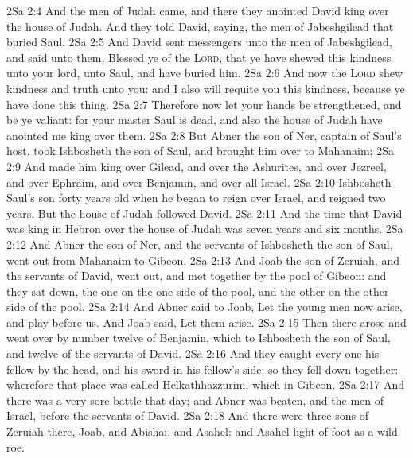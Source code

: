 \vs 2Sa 2:4 And the men of Judah came, and there they anointed David king over the house of Judah. And they told David, saying,  the men of Jabeshgilead  that buried Saul.
\vs 2Sa 2:5 And David sent messengers unto the men of Jabeshgilead, and said unto them, Blessed  ye of the \textsc{Lord}, that ye have shewed this kindness unto your lord,  unto Saul, and have buried him.
\vs 2Sa 2:6 And now the \textsc{Lord} shew kindness and truth unto you: and I also will requite you this kindness, because ye have done this thing.
\vs 2Sa 2:7 Therefore now let your hands be strengthened, and be ye valiant: for your master Saul is dead, and also the house of Judah have anointed me king over them.
\vs 2Sa 2:8 But Abner the son of Ner, captain of Saul's host, took Ishbosheth the son of Saul, and brought him over to Mahanaim;
\vs 2Sa 2:9 And made him king over Gilead, and over the Ashurites, and over Jezreel, and over Ephraim, and over Benjamin, and over all Israel.
\vs 2Sa 2:10 Ishbosheth Saul's son  forty years old when he began to reign over Israel, and reigned two years. But the house of Judah followed David.
\vs 2Sa 2:11 And the time that David was king in Hebron over the house of Judah was seven years and six months.
\vs 2Sa 2:12 And Abner the son of Ner, and the servants of Ishbosheth the son of Saul, went out from Mahanaim to Gibeon.
\vs 2Sa 2:13 And Joab the son of Zeruiah, and the servants of David, went out, and met together by the pool of Gibeon: and they sat down, the one on the one side of the pool, and the other on the other side of the pool.
\vs 2Sa 2:14 And Abner said to Joab, Let the young men now arise, and play before us. And Joab said, Let them arise.
\vs 2Sa 2:15 Then there arose and went over by number twelve of Benjamin, which  to Ishbosheth the son of Saul, and twelve of the servants of David.
\vs 2Sa 2:16 And they caught every one his fellow by the head, and  his sword in his fellow's side; so they fell down together: wherefore that place was called Helkathhazzurim, which  in Gibeon.
\vs 2Sa 2:17 And there was a very sore battle that day; and Abner was beaten, and the men of Israel, before the servants of David.
\vs 2Sa 2:18 And there were three sons of Zeruiah there, Joab, and Abishai, and Asahel: and Asahel  light of foot as a wild roe.
